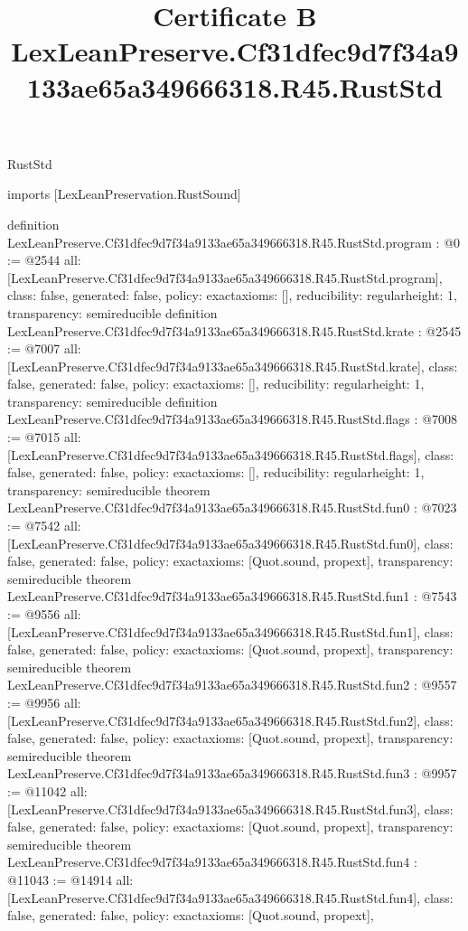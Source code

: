\begin{lexlean}{RustStd}
\title{Certificate B LexLeanPreserve.Cf31dfec9d7f34a9133ae65a349666318.R45.RustStd}
\begin{coremodule}
imports [LexLeanPreservation.RustSound]

definition LexLeanPreserve.Cf31dfec9d7f34a9133ae65a349666318.R45.RustStd.program : @0 := @2544 {
  all: [LexLeanPreserve.Cf31dfec9d7f34a9133ae65a349666318.R45.RustStd.program],
  class: false,
  generated: false,
  policy: exact{axioms: []},
  reducibility: regular{height: 1},
  transparency: semireducible
}
definition LexLeanPreserve.Cf31dfec9d7f34a9133ae65a349666318.R45.RustStd.krate : @2545 := @7007 {
  all: [LexLeanPreserve.Cf31dfec9d7f34a9133ae65a349666318.R45.RustStd.krate],
  class: false,
  generated: false,
  policy: exact{axioms: []},
  reducibility: regular{height: 1},
  transparency: semireducible
}
definition LexLeanPreserve.Cf31dfec9d7f34a9133ae65a349666318.R45.RustStd.flags : @7008 := @7015 {
  all: [LexLeanPreserve.Cf31dfec9d7f34a9133ae65a349666318.R45.RustStd.flags],
  class: false,
  generated: false,
  policy: exact{axioms: []},
  reducibility: regular{height: 1},
  transparency: semireducible
}
theorem LexLeanPreserve.Cf31dfec9d7f34a9133ae65a349666318.R45.RustStd.fun0 : @7023 := @7542 {
  all: [LexLeanPreserve.Cf31dfec9d7f34a9133ae65a349666318.R45.RustStd.fun0],
  class: false,
  generated: false,
  policy: exact{axioms: [Quot.sound, propext]},
  transparency: semireducible
}
theorem LexLeanPreserve.Cf31dfec9d7f34a9133ae65a349666318.R45.RustStd.fun1 : @7543 := @9556 {
  all: [LexLeanPreserve.Cf31dfec9d7f34a9133ae65a349666318.R45.RustStd.fun1],
  class: false,
  generated: false,
  policy: exact{axioms: [Quot.sound, propext]},
  transparency: semireducible
}
theorem LexLeanPreserve.Cf31dfec9d7f34a9133ae65a349666318.R45.RustStd.fun2 : @9557 := @9956 {
  all: [LexLeanPreserve.Cf31dfec9d7f34a9133ae65a349666318.R45.RustStd.fun2],
  class: false,
  generated: false,
  policy: exact{axioms: [Quot.sound, propext]},
  transparency: semireducible
}
theorem LexLeanPreserve.Cf31dfec9d7f34a9133ae65a349666318.R45.RustStd.fun3 : @9957 := @11042 {
  all: [LexLeanPreserve.Cf31dfec9d7f34a9133ae65a349666318.R45.RustStd.fun3],
  class: false,
  generated: false,
  policy: exact{axioms: [Quot.sound, propext]},
  transparency: semireducible
}
theorem LexLeanPreserve.Cf31dfec9d7f34a9133ae65a349666318.R45.RustStd.fun4 : @11043 := @14914 {
  all: [LexLeanPreserve.Cf31dfec9d7f34a9133ae65a349666318.R45.RustStd.fun4],
  class: false,
  generated: false,
  policy: exact{axioms: [Quot.sound, propext]},
}
\end{coremodule}
\end{lexlean}
